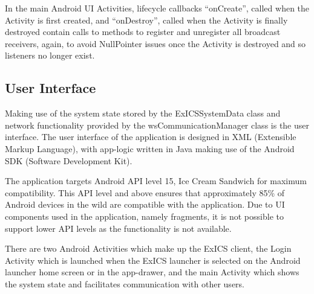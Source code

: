 In the main Android UI Activities, lifecycle callbacks ``onCreate'', called when the Activity is first created, and ``onDestroy'', called when the Activity is finally destroyed contain calls to methods to register and unregister all broadcast receivers, again, to avoid NullPointer issues once the Activity is destroyed and so listeners no longer exist.

\subsection{User Interface}

\FloatBarrier

Making use of the system state stored by the ExICSSystemData class and network functionality provided by the wsCommunicationManager class is the user interface.  The user interface of the application is designed in XML (Extensible Markup Language), with app-logic written in Java making use of the Android SDK (Software Development Kit).

The application targets Android API level 15, Ice Cream Sandwich for maximum compatibility.  This API level and above ensures that approximately 85\% of Android devices in the wild are compatible with the application\cite{androidAPInums}.  Due to UI components used in the application, namely fragments\cite{fragments}, it is not possible to support lower API levels as the functionality is not available.

There are two Android Activities which make up the ExICS client, the Login Activity which is launched when the ExICS launcher is selected on the Android launcher home screen or in the app-drawer, and the main Activity which shows the system state and facilitates communication with other users.


